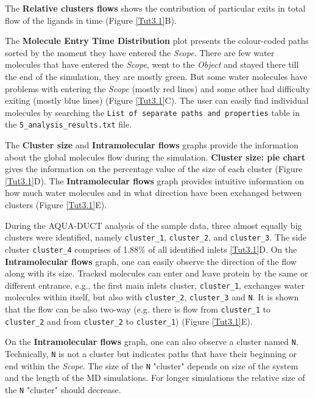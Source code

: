 \documentclass[9pt,tutorial]{livecoms}
\begin{document}
The \textbf{Relative clusters flows} shows the contribution of particular exits in total flow of the ligands in time ({Figure \ref{Tut3.1}B}).

The \textbf{Molecule Entry Time Distribution} plot presents the colour-coded paths sorted by the moment they have entered the \textit{Scope}. There are few water molecules that have entered the \textit{Scope}, went to the \textit{Object} and stayed there till the end of the simulation, they are mostly green. But some water molecules have problems with entering the \textit{Scope} (mostly red lines) and some other had difficulty exiting (mostly blue lines) (Figure \ref{Tut3.1}C). The user can easily find individual molecules by searching the \texttt{List of separate paths and properties} table in the \texttt{5\_analysis\_results.txt} file.

The \textbf{Cluster size} and \textbf{Intramolecular flows} graphs provide the information about the global molecules flow during the simulation. \textbf{Cluster size: pie chart} gives the information on the percentage value of the size of each cluster (Figure \ref{Tut3.1}D). The \textbf{Intramolecular flows} graph provides intuitive information on how much water molecules and in what direction have been exchanged between clusters (Figure \ref{Tut3.1}E). 

During the AQUA-DUCT analysis of the sample data, three almost equally big clusters were identified, namely \texttt{cluster\_1}, \texttt{cluster\_2}, and \texttt{cluster\_3}. The side cluster \texttt{cluster\_4} comprises of 1.88\% of all identified inlets \ref{Tut3.1}D. On the \textbf{Intramolecular flows} graph, one can easily observe the direction of the flow along with its size. Tracked molecules can enter and leave protein by the same or different entrance, e.g., the first main inlets cluster, \texttt{cluster\_1}, exchanges water molecules within itself, but also with \texttt{cluster\_2}, \texttt{cluster\_3} and \texttt{N}. It is shown that the flow can be also two-way (e.g. there is flow from \texttt{cluster\_1} to \texttt{cluster\_2} and from \texttt{cluster\_2} to \texttt{cluster\_1}) (Figure \ref{Tut3.1}E). 

On the \textbf{Intramolecular flows} graph, one can also observe a cluster named \texttt{N}. Technically, \texttt{N} is not a cluster but indicates paths that have their beginning or end within the \emph{Scope}. The size of the \texttt{N} "cluster" depends on size of the system and the length of the MD simulations. For longer simulations the relative size of the \texttt{N} "cluster" should decrease.
\end{document}
